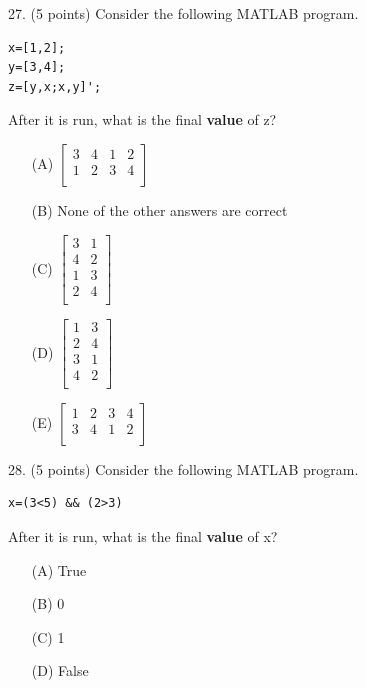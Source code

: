 \documentclass{article}
\begin{document}
\noindent
\begin{minipage}{\textwidth}
27. (5 points)
Consider the following MATLAB program.
\begin{verbatim}
x=[1,2];
y=[3,4];
z=[y,x;x,y]';
\end{verbatim}
After it is run, what is the final \textbf{value} of z?

\begin{enumerate}
\item[(A)]
$ \left[ \begin{array}{cccc} 3 & 4 & 1 & 2\\ 1 & 2 & 3 & 4 \\ \end{array} \right] $

\item[(B)]
None of the other answers are correct

\item[(C)]
$ \left[ \begin{array}{cc} 3 & 1 \\ 4 & 2 \\ 1 & 3 \\ 2 & 4 \\ \end{array} \right] $

\item[(D)]
$ \left[ \begin{array}{cc} 1 & 3 \\ 2 & 4 \\ 3 & 1 \\ 4 & 2 \\ \end{array} \right] $

\item[(E)]
$ \left[ \begin{array}{cccc} 1 & 2 & 3 & 4\\ 3 & 4 & 1 & 2 \\ \end{array} \right] $

\end{enumerate}
\end{minipage}
\vspace{10em}
\filbreak\vfil{}\vfilneg

\noindent
\begin{minipage}{\textwidth}
28. (5 points)
Consider the following MATLAB program.
\begin{verbatim}
x=(3<5) && (2>3)
\end{verbatim}
After it is run, what is the final \textbf{value} of x?

\begin{enumerate}
\item[(A)]
True

\item[(B)]
0

\item[(C)]
1

\item[(D)]
False

\end{enumerate}
\end{minipage}
\vspace{10em}
\filbreak\vfil{}\vfilneg
\end{document}
